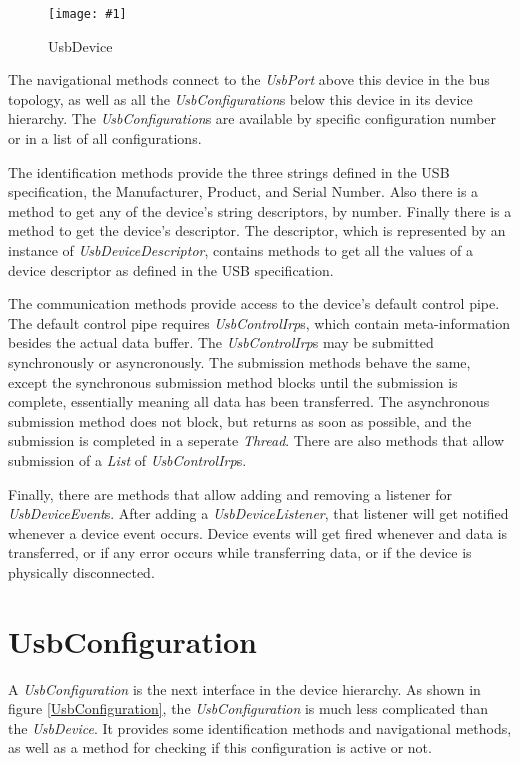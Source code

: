 \documentclass{article}
\newcommand{\myclass}[1]{\emph{#1}}
\newcommand{\myinterface}[1]{\emph{#1}}
\newcommand{\mysectionend}[0]{\vfill\pagebreak[1]}
\newcommand{\myfigure}[3]{\begin{figure}[htbp]\centering\texttt{[image: \#1]}\caption{#2}\label{#3}\end{figure}}
\begin{document}
\myfigure{figs/UsbDevice}{UsbDevice}{UsbDevice}

The navigational methods connect to the \myinterface{UsbPort} above this
device in the bus topology, as well as all the \myinterface{UsbConfiguration}s
below this device in its device hierarchy.  The \myinterface{UsbConfiguration}s
are available by specific configuration number or in a list of
all configurations.

The identification methods provide the three strings defined in
the USB specification, the Manufacturer, Product, and Serial Number.
Also there is a method to get any of the device's string descriptors,
by number.  Finally there is a method to get the device's descriptor.
The descriptor, which is represented by an instance of \myinterface{UsbDeviceDescriptor},
contains methods to get all the values of a device descriptor as
defined in the USB specification.

The communication methods provide access to the device's default control
pipe.  The default control pipe requires \myinterface{UsbControlIrp}s, which contain
meta-information besides the actual data buffer.  The \myinterface{UsbControlIrp}s
may be submitted synchronously or asyncronously.  The submission methods
behave the same, except the synchronous submission method blocks until
the submission is complete, essentially meaning all data has been transferred.
The asynchronous submission method does not block, but returns as soon as
possible, and the submission is completed in a seperate \myclass{Thread}.  There
are also methods that allow submission of a \myinterface{List} of \myinterface{UsbControlIrp}s.

Finally, there are methods that allow adding and removing a listener for
\myclass{UsbDeviceEvent}s.  After adding a \myinterface{UsbDeviceListener}, that listener will
get notified whenever a device event occurs.  Device events will get
fired whenever and data is transferred, or if any error occurs while
transferring data, or if the device is physically disconnected.

\mysectionend


\section{UsbConfiguration}

A \myinterface{UsbConfiguration} is the next interface in the device hierarchy.
As shown in figure \ref{UsbConfiguration}, the \myinterface{UsbConfiguration}
is much less complicated than the \myinterface{UsbDevice}.  It provides some
identification methods and navigational methods, as well as a
method for checking if this configuration is active or not.
\end{document}
